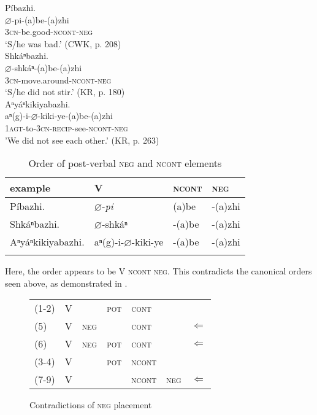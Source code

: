 \documentclass[output=paper]{LSP/langsci}
\begin{document}
\ea\label{negncont}
  \ea \label{negncont1} Píbazhi.\\
  \gll   $\varnothing$-pi-(a)be-(a)zhi\\
  \textsc{3cn}-be.good-\textsc{ncont}-\textsc{neg}\\
  \glt `S/he was bad.' (CWK, p. 208) \\ 
  
  \ex  \label{negncont2}Shkáⁿbazhi.\\
  \gll   $\varnothing$-shkáⁿ-(a)be-(a)zhi \\
  \textsc{3cn}-move.around-\textsc{ncont}-\textsc{neg} \\
  \glt `S/he did not stir.' (KR, p. 180) \\ 
  
  \ex  \label{negncont3} Aⁿyáⁿkikiyabazhi.\\
  \gll   aⁿ(g)-i-$\varnothing$-kiki-ye-(a)be-(a)zhi \\
  \textsc{1agt}-to-\textsc{3cn}-\textsc{recip}-see-\textsc{ncont}-\textsc{neg} \\
  \glt 'We did not see each other.' (KR, p. 263) \\ 
\z 
\z

\begin{table}
\caption{Order of post-verbal \textsc{neg} and \textsc{ncont} elements} \label{tablenegncont}
\begin{tabular}[h!]{ l l l l }
\lsptoprule
example & V & \textsc{ncont} & \textsc{neg} \\
\midrule
Píbazhi. & $\varnothing$-\textit{pi}	& (a)be	& -(a)zhi \\
Shkáⁿbazhi. & $\varnothing$-shkáⁿ & -(a)be & -(a)zhi \\
Aⁿyáⁿkikiyabazhi. & aⁿ(g)-i-$\varnothing$-kiki-ye & -(a)be & -(a)zhi \\
\lspbottomrule
\end{tabular}
\end{table}
 
Here, the order appears to be V \textsc{ncont neg}. This contradicts the canonical orders seen above, as demonstrated in .

\begin{figure}
\caption{Contradictions of  \textsc{neg} placement} \label{contradictions}
\begin{tabular}{ l l l l l l l }
(1-2) & V & & \textsc{pot} & \textsc{cont} & & \\
(5) & V & \textsc{neg} & & \textsc{cont} & & $\Leftarrow$ \\
(6) & V & \textsc{neg} & \textsc{pot} & \textsc{cont} & & $\Leftarrow$ \\
(3-4) & V & & \textsc{pot} & \textsc{ncont} & & \\
(7-9) & V & & & \textsc{ncont} & \textsc{neg} & $\Leftarrow$ \\
\end{tabular}
\end{figure}
\end{document}
